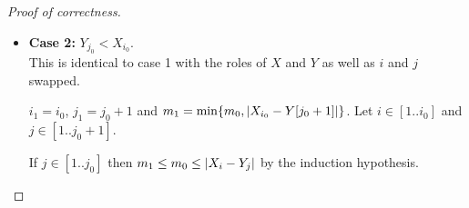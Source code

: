 \documentclass[12pt]{article}
\begin{document}
\begin{solution}
\begin{enumerate}[wide]
\begin{proof}[Proof of correctness]
\begin{itemize}
                        If $i \in [1..i_0]$ then $m_1 \leq m_0 \leq \abs{X_{i} - Y_{j}}$
                        by the induction hypothesis.

                        If $i = i_0 + 1$, then we have two subcases.
                        \begin{itemize}
                            \item \textbf{Case 1.1:} $j = j_0$. \\
                                Then $m_1 = \min\set{m_0, \abs{X_{i} - Y_{j}}} \leq \abs{X_{i} - Y_{j}}$.
                            \item \textbf{Case 1.2:} $j < j_0$. \\
                                Then $m_1 \leq m_0 \leq \abs{X_{i_0} - Y_{j}} = X_{i_0} - Y_{j} \leq X_{i} - Y_{j}$,
                                since $X_{i_0} \geq \max Y[1..j-1]$ and $X$ is increasing.
                        \end{itemize}
                        Since all possible values of $m_1$ are of the form $x - y$
                        for some $x \in A[i..i_1], y \in B[1..j_1]$, \[
                            m_1 = \min\set{\abs{x - y} \mid x \in A[1..i_1], y \in B[1..j_1]}.
                        \] Moreover, \[
                            X_{i_1} \geq X_{i_0} \geq \max Y[1..j_0-1] = \max Y[1..j_1-1]
                        \] and \[
                            Y_{j_1} = Y_{j_0} \geq X_{i_0} = \max X[1..i_0] \geq \max X[1..i_1-1].
                        \]
                    \item \textbf{Case 2:} $Y_{j_0} < X_{i_0}$. \\
                        This is identical to case 1 with the roles of $X$ and $Y$ as well as
                        $i$ and $j$ swapped.

                        $i_1 = i_0$, $j_1 = j_0 + 1$ and
                        $m_1 = \min\set{m_0, \abs{X_{i_0} - Y[j_0 + 1]}}$.
                        Let $i \in [1..i_0]$ and $j \in [1..j_0 + 1]$.

                        If $j \in [1..j_0]$ then $m_1 \leq m_0 \leq \abs{X_{i} - Y_{j}}$
                        by the induction hypothesis.


\end{itemize}
\end{proof}
\end{enumerate}
\end{solution}
\end{document}
